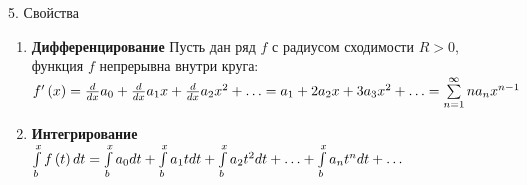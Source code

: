 5. Свойства
\begin{enumerate}
    \item \textbf{Дифференцирование}
    Пусть дан ряд $f$ с радиусом сходимости $R > 0$, функция $f$ непрерывна внутри круга:
    $ f'\left( x \right) = \large\frac{d}{{dx}}\normalsize{a_0} + \large\frac{d}{{dx}}\normalsize{a_1}x + \large\frac{d}{{dx}}\normalsize{a_2}{x^2} +  \ldots  = {a_1} + 2{a_2}x + 3{a_3}{x^2} +  \ldots  = \sum\limits_{n = 1}^\infty  {n{a_n}{x^{n - 1}}}$
    \item \textbf{Интегрирование}
    $\large\int\limits_b^x\normalsize {f\left( t \right)dt}  = \large\int\limits_b^x\normalsize {{a_0}dt}  + \large\int\limits_b^x\normalsize {{a_1}tdt}  + \large\int\limits_b^x\normalsize {{a_2}{t^2}dt}  +  \ldots  + \large\int\limits_b^x\normalsize {{a_n}{t^n}dt}  +  \ldots$
\end{enumerate}
